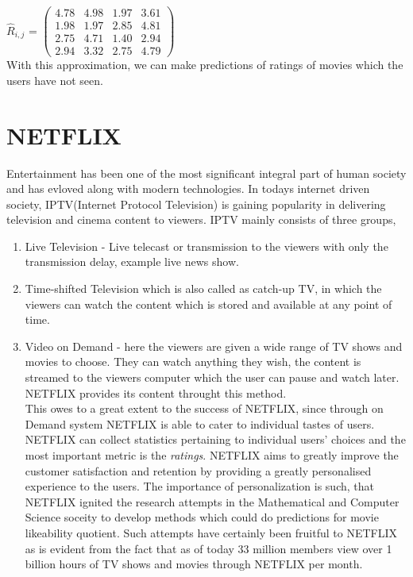 \begin{example}
$\hat{R}_{i,j}$ =
 $\begin{pmatrix}
  4.78 & 4.98 & 1.97 & 3.61 \\
  1.98 & 1.97 & 2.85 & 4.81 \\
  2.75 & 4.71 & 1.40 & 2.94  \\
  2.94 & 3.32 & 2.75 & 4.79
 \end{pmatrix} $\\
 
 With this approximation, we can make predictions of ratings of movies which the
users have not seen. 
 
\end{example}

\section{NETFLIX}
Entertainment has been one of the most significant integral part of human
society and has evloved along with modern technologies. In todays internet
driven society, IPTV(Internet Protocol Television) is gaining popularity in
delivering television and cinema content to viewers. IPTV mainly consists of
three groups, \\
\begin{enumerate}%
\item Live Television - Live telecast or transmission to the viewers with only
the transmission delay, example live news show.
\item Time-shifted Television which is also called as catch-up TV, in which the
viewers can watch the content which is stored and available at any point of
time. 
\item Video on Demand - here the viewers are given a wide range of TV shows and
movies to choose. They can watch anything they wish, the content is streamed to
the viewers computer which the user can pause and watch later. NETFLIX provides
its content throught this method. \\
This owes to a great extent to the success of NETFLIX, since through on Demand
system NETFLIX is able to cater to individual tastes of users. NETFLIX can
collect statistics pertaining to individual users' choices and the most
important metric is the \emph{ratings}. NETFLIX aims to greatly improve the
customer satisfaction and retention by providing a greatly personalised
experience to the users. The importance of personalization is such, that NETFLIX
ignited the research attempts in the Mathematical and Computer Science soceity
to develop methods which could do predictions for movie likeability quotient.
Such attempts have certainly been fruitful to NETFLIX as is evident from the
fact that as of today 33 million members view over 1 billion hours of TV shows
and movies through NETFLIX per month.
\end{enumerate}

